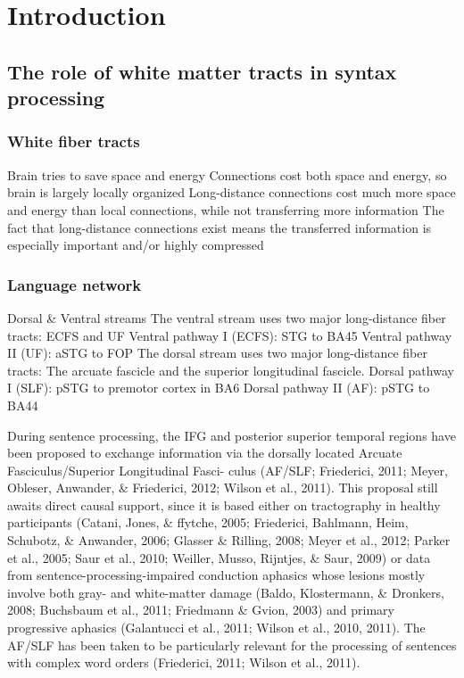 
\chapter{Introduction}

\section{The role of white matter tracts in syntax processing}

\subsection{White fiber tracts}
Brain tries to save space and energy
Connections cost both space and energy, so brain is largely locally organized
Long-distance connections cost much more space and energy than local connections, while not transferring more information
The fact that long-distance connections exist means the transferred information is especially important and/or highly compressed

\subsection{Language network}
Dorsal \& Ventral streams
The ventral stream uses two major long-distance fiber tracts: ECFS and UF
Ventral pathway I (ECFS): STG to BA45
Ventral pathway II (UF): aSTG to FOP
The dorsal stream uses two major long-distance fiber tracts: The arcuate fascicle and the superior longitudinal fascicle.
Dorsal pathway I (SLF): pSTG to premotor cortex in BA6
Dorsal pathway II (AF): pSTG to BA44

During sentence processing, the IFG and posterior superior
 temporal regions have been proposed to exchange information via
 the dorsally located Arcuate Fasciculus/Superior Longitudinal Fasci-
 culus (AF/SLF; Friederici, 2011; Meyer, Obleser, Anwander, \&
 Friederici, 2012; Wilson et al., 2011). This proposal still awaits direct
 causal support, since it is based either on tractography in healthy
 participants (Catani, Jones, \& ffytche, 2005; Friederici, Bahlmann,
 Heim, Schubotz, \& Anwander, 2006; Glasser \& Rilling, 2008; Meyer
 et al., 2012; Parker et al., 2005; Saur et al., 2010; Weiller, Musso,
 Rijntjes, \& Saur, 2009) or data from sentence-processing-impaired
 conduction aphasics whose lesions mostly involve both gray- and
 white-matter damage (Baldo, Klostermann, \& Dronkers, 2008; Buchsbaum et al., 2011; Friedmann \& Gvion, 2003) and primary
 progressive aphasics (Galantucci et al., 2011; Wilson et al., 2010,
 2011). The AF/SLF has been taken to be particularly relevant for the
 processing of sentences with complex word orders (Friederici,
 2011; Wilson et al., 2011).

